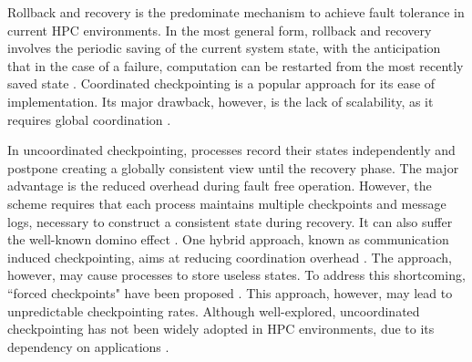 Rollback and recovery is the predominate mechanism to achieve fault
tolerance in current HPC environments. In the most general form, rollback and recovery 
involves the periodic saving of the current system state, with the anticipation that
in the case of a failure, computation can be restarted from the most recently saved state \cite{Elnozahy:02:Survey}. %
Coordinated checkpointing is a popular approach for
its ease of implementation.
Its major drawback, however, is the
lack of scalability, as it requires global coordination
\cite{elnozahy_dsc_2004,riesen_sandia_2010}.


In uncoordinated checkpointing, processes record their states independently and postpone creating a 
globally consistent view until the recovery phase. The major advantage is the reduced overhead during fault free operation. However, the scheme requires that
each process maintains multiple checkpoints and message logs, necessary to construct a consistent 
state during recovery. It can also suffer the well-known domino effect 
 \cite{randell_domino_effect}. One hybrid approach, known as communication induced 
checkpointing, aims at reducing coordination overhead \cite{alvisi_ftc_1999}. The approach, however, may 
cause processes to store useless states. To address this 
shortcoming, ``forced checkpoints" have been proposed \cite{helary_rds_1997}. This approach, however,  may lead to unpredictable
checkpointing rates. Although well-explored, uncoordinated checkpointing has not been widely adopted
in HPC environments, due to its dependency on applications \cite{guermouche_2011_ipdps}.


